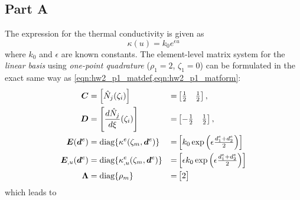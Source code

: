 \subsection{Part A}
The expression for the thermal conductivity is given as 
\begin{equation}\label{eqn:hw2_p2_kappa}
    \kappa(u) = k_0 e^{\epsilon u}
\end{equation}
where $k_0$ and $\epsilon$ are known constants. 
The element-level matrix system for the \emph{linear basis} using \emph{one-point quadrature} ($\rho_1 = 2$, $\zeta_1 = 0$) can be formulated in the exact same way as \cref{eqn:hw2_p1_matdef,eqn:hw2_p1_matform}:
\begin{equation}
\begin{aligned}
    \bm{C} &= \left[\hat{N}_{j}(\zeta_i)\right] &=& \begin{bmatrix}
        \frac{1}{2} & \frac{1}{2} 
    \end{bmatrix}, \\
    \bm{D} &= \left[\frac{d\hat{N}_{j}}{d\xi}(\zeta_i)\right] &=& \begin{bmatrix}
        -\frac{1}{2} & \frac{1}{2} 
    \end{bmatrix}, \\
    \bm{E}(\bm{d}^e) &= \textrm{diag}\{\kappa^e(\zeta_m, \bm{d}^e)\} &=& \begin{bmatrix}
        k_0 \exp \left(\epsilon \frac{d_1^e + d_2^e}{2}\right)
    \end{bmatrix} \\
    \bm{E}_{,u}(\bm{d}^e) &= \textrm{diag}\{\kappa_{,u}^e(\zeta_m, \bm{d}^e)\} &=& \begin{bmatrix}
        \epsilon k_0 \exp \left(\epsilon \frac{d_1^e + d_2^e}{2}\right)
    \end{bmatrix} \\
    \bm{\Lambda} &= \textrm{diag}\{\rho_m\} &=& \begin{bmatrix}
        2
    \end{bmatrix} \\
\end{aligned}
\end{equation}
which leads to 
